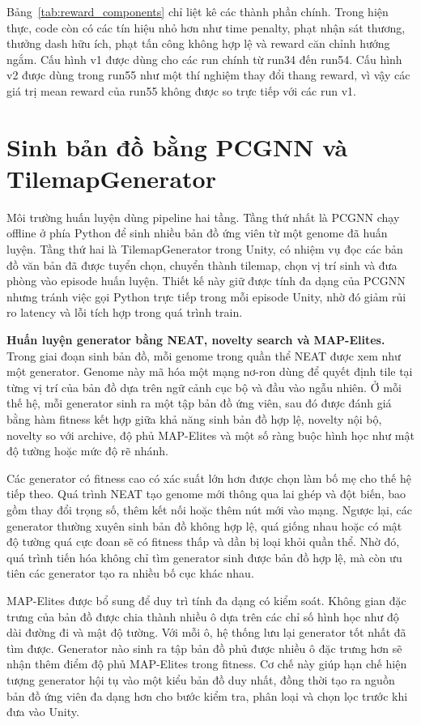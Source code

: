 Bảng~\ref{tab:reward_components} chỉ liệt kê các thành phần chính. Trong hiện thực, code còn có các tín hiệu nhỏ hơn như time penalty, phạt nhận sát thương, thưởng dash hữu ích, phạt tấn công không hợp lệ và reward căn chỉnh hướng ngắm. Cấu hình v1 được dùng cho các run chính từ run34 đến run54. Cấu hình v2 được dùng trong run55 như một thí nghiệm thay đổi thang reward, vì vậy các giá trị mean reward của run55 không được so trực tiếp với các run v1.

\section{Sinh bản đồ bằng PCGNN và TilemapGenerator}

Môi trường huấn luyện dùng pipeline hai tầng. Tầng thứ nhất là PCGNN chạy offline ở phía Python để sinh nhiều bản đồ ứng viên từ một genome đã huấn luyện. Tầng thứ hai là TilemapGenerator trong Unity, có nhiệm vụ đọc các bản đồ văn bản đã được tuyển chọn, chuyển thành tilemap, chọn vị trí sinh và đưa phòng vào episode huấn luyện. Thiết kế này giữ được tính đa dạng của PCGNN nhưng tránh việc gọi Python trực tiếp trong mỗi episode Unity, nhờ đó giảm rủi ro latency và lỗi tích hợp trong quá trình train.

\textbf{Huấn luyện generator bằng NEAT, novelty search và MAP-Elites.} Trong giai đoạn sinh bản đồ, mỗi genome trong quần thể NEAT được xem như một generator. Genome này mã hóa một mạng nơ-ron dùng để quyết định tile tại từng vị trí của bản đồ dựa trên ngữ cảnh cục bộ và đầu vào ngẫu nhiên. Ở mỗi thế hệ, mỗi generator sinh ra một tập bản đồ ứng viên, sau đó được đánh giá bằng hàm fitness kết hợp giữa khả năng sinh bản đồ hợp lệ, novelty nội bộ, novelty so với archive, độ phủ MAP-Elites và một số ràng buộc hình học như mật độ tường hoặc mức độ rẽ nhánh.

Các generator có fitness cao có xác suất lớn hơn được chọn làm bố mẹ cho thế hệ tiếp theo. Quá trình NEAT tạo genome mới thông qua lai ghép và đột biến, bao gồm thay đổi trọng số, thêm kết nối hoặc thêm nút mới vào mạng. Ngược lại, các generator thường xuyên sinh bản đồ không hợp lệ, quá giống nhau hoặc có mật độ tường quá cực đoan sẽ có fitness thấp và dần bị loại khỏi quần thể. Nhờ đó, quá trình tiến hóa không chỉ tìm generator sinh được bản đồ hợp lệ, mà còn ưu tiên các generator tạo ra nhiều bố cục khác nhau.

MAP-Elites được bổ sung để duy trì tính đa dạng có kiểm soát. Không gian đặc trưng của bản đồ được chia thành nhiều ô dựa trên các chỉ số hình học như độ dài đường đi và mật độ tường. Với mỗi ô, hệ thống lưu lại generator tốt nhất đã tìm được. Generator nào sinh ra tập bản đồ phủ được nhiều ô đặc trưng hơn sẽ nhận thêm điểm độ phủ MAP-Elites trong fitness. Cơ chế này giúp hạn chế hiện tượng generator hội tụ vào một kiểu bản đồ duy nhất, đồng thời tạo ra nguồn bản đồ ứng viên đa dạng hơn cho bước kiểm tra, phân loại và chọn lọc trước khi đưa vào Unity.


